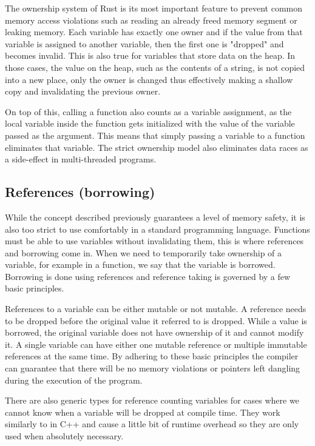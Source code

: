 The ownership system of Rust is its most important feature to prevent common memory access violations such as reading an already freed memory segment or leaking memory. Each variable has exactly one owner and if the value from that variable is assigned to another variable, then the first one is "dropped" and becomes invalid. This is also true for variables that store data on the heap. In those cases, the value on the heap, such as the contents of a string, is not copied into a new place, only the owner is changed thus effectively making a shallow copy and invalidating the previous owner.

On top of this, calling a function also counts as a variable assignment, as the local variable inside the function gets initialized with the value of the variable passed as the argument. This means that simply passing a variable to a function eliminates that variable. The strict ownership model also eliminates data races as a side-effect in multi-threaded programs.

\subsection{References (borrowing)}

While the concept described previously guarantees a level of memory safety, it is also too strict to use comfortably in a standard programming language. Functions must be able to use variables without invalidating them, this is where references and borrowing come in. When we need to temporarily take ownership of a variable, for example in a function, we say that the variable is borrowed. Borrowing is done using references and reference taking is governed by a few basic principles.

References to a variable can be either mutable or not mutable. A reference needs to be dropped before the original value it referred to is dropped. While a value is borrowed, the original variable does not have ownership of it and cannot modify it. A single variable can have either one mutable reference or multiple immutable references at the same time. By adhering to these basic principles the compiler can guarantee that there will be no memory violations or pointers left dangling during the execution of the program.

There are also generic types for reference counting variables for cases where we cannot know when a variable will be dropped at compile time. They work similarly to  in C++ and cause a little bit of runtime overhead so they are only used when absolutely necessary.

